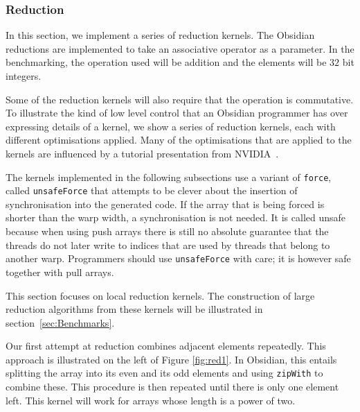 \subsubsection{Reduction}  
\label{sec:redOpt}



In this section, we implement a series of reduction kernels. The Obsidian 
reductions are implemented to take an associative operator as a parameter. 
In the benchmarking, the operation used will be addition and the elements 
will be $32$ bit integers. 


Some of the reduction 
kernels will also require that the operation is commutative. 
To illustrate the kind of low level control that an 
Obsidian programmer has over expressing details of a kernel, we show a series 
of reduction kernels, each with different optimisations applied. Many of the 
optimisations that are applied to the kernels are influenced by a 
tutorial presentation from NVIDIA~.



The kernels implemented in the following subsections use a variant of {\tt force}, 
called {\tt unsafeForce} that attempts to be clever about the insertion 
of synchronisation into the generated code. If the array that is being forced 
is shorter than the warp width, a synchronisation is not needed. It is called 
unsafe because when using push arrays there is still no absolute guarantee 
that the threads do not later write to indices that are used by threads that belong to another 
warp. Programmers should use {\tt unsafeForce} with care; it 
is however safe together with pull arrays. 

This section focuses on local reduction kernels. The construction of large 
reduction algorithms from these kernels will be illustrated in 
section~\ref{sec:Benchmarks}. 


Our first attempt at reduction combines adjacent elements repeatedly.
This approach is illustrated on the left of Figure \ref{fig:red1}. 
In Obsidian, this entails splitting the array into its even and its odd elements and using {\tt zipWith} to combine these. 
This procedure is then repeated until there is only one element left. This 
kernel will work for arrays whose length is a power of two. 

